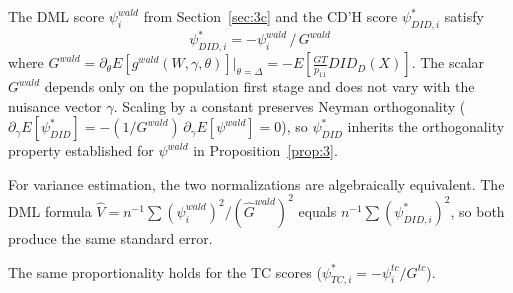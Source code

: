 The DML score $\psi^{wald}_i$ from Section~\ref{sec:3c} and the CD'H score $\psi^*_{DID,i}$ satisfy
$$\psi^*_{DID,i} = -\psi^{wald}_i \,/\, G^{wald}$$
where $G^{wald} = \partial_\theta E[g^{wald}(W, \gamma, \theta)]\big|_{\theta = \Delta} = -E\!\left[\frac{GT}{p_{11}} DID_D(X)\right]$. The scalar $G^{wald}$ depends only on the population first stage and does not vary with the nuisance vector $\gamma$. Scaling by a constant preserves Neyman orthogonality ($\partial_\gamma E[\psi^*_{DID}] = -(1/G^{wald})\,\partial_\gamma E[\psi^{wald}] = 0$), so $\psi^*_{DID}$ inherits the orthogonality property established for $\psi^{wald}$ in Proposition~\ref{prop:3}.

For variance estimation, the two normalizations are algebraically equivalent. The DML formula $\hat{V} = n^{-1}\sum (\psi^{wald}_i)^2 / (\hat{G}^{wald})^2$ equals $n^{-1}\sum (\psi^*_{DID,i})^2$, so both produce the same standard error.

The same proportionality holds for the TC scores ($\psi^*_{TC,i} = -\psi^{tc}_i / G^{tc}$).
